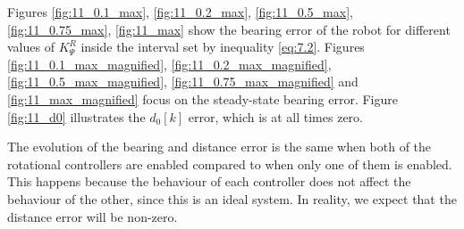 Figures \ref{fig:11_0.1_max}, \ref{fig:11_0.2_max}, \ref{fig:11_0.5_max},
\ref{fig:11_0.75_max}, \ref{fig:11_max} show the bearing error of the robot
for different values of $K_{\Psi}^R$ inside the interval set by inequality
\ref{eq:7.2}. Figures \ref{fig:11_0.1_max_magnified},
\ref{fig:11_0.2_max_magnified}, \ref{fig:11_0.5_max_magnified},
\ref{fig:11_0.75_max_magnified} and \ref{fig:11_max_magnified} focus on the
steady-state bearing error. Figure \ref{fig:11_d0} illustrates the $d_0[k]$
error, which is at all times zero.

The evolution of the bearing and distance error is the same when both of the
rotational controllers are enabled compared to when only one of them is enabled.
This happens because the behaviour of each controller does not affect the
behaviour of the other, since this is an ideal system. In reality, we expect
that the distance error will be non-zero.

\noindent{}

\noindent{}

